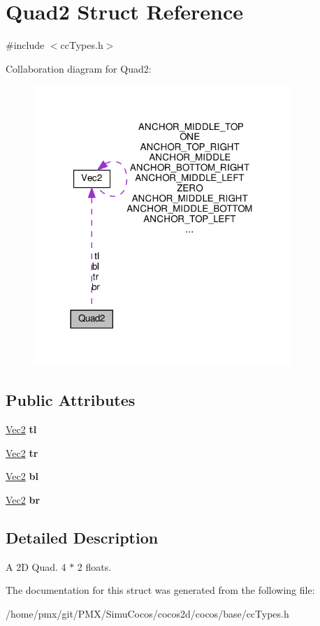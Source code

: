 \hypertarget{structQuad2}{}\section{Quad2 Struct Reference}
\label{structQuad2}


{\ttfamily \#include $<$cc\+Types.\+h$>$}



Collaboration diagram for Quad2\+:
\nopagebreak
\begin{figure}[H]
\begin{center}
\leavevmode
\includegraphics[width=276pt]{structQuad2__coll__graph}
\end{center}
\end{figure}
\subsection*{Public Attributes}
\begin{DoxyCompactItemize}
\item 
\mbox{\label{structQuad2_af32e702b27636f7036fb92f257a4ac27}} 
\hyperlink{classVec2}{Vec2} {\bfseries tl}
\item 
\mbox{\label{structQuad2_ab2d8d03e810078efb4e663888067a876}} 
\hyperlink{classVec2}{Vec2} {\bfseries tr}
\item 
\mbox{\label{structQuad2_af8f18b597cfdb10d38a8bf55db2ab716}} 
\hyperlink{classVec2}{Vec2} {\bfseries bl}
\item 
\mbox{\label{structQuad2_affb6cc7e3cd254eb9d466bc3da926fda}} 
\hyperlink{classVec2}{Vec2} {\bfseries br}
\end{DoxyCompactItemize}


\subsection{Detailed Description}
A 2D Quad. 4 $\ast$ 2 floats. 

The documentation for this struct was generated from the following file\+:\begin{DoxyCompactItemize}
\item 
/home/pmx/git/\+P\+M\+X/\+Simu\+Cocos/cocos2d/cocos/base/cc\+Types.\+h\end{DoxyCompactItemize}
